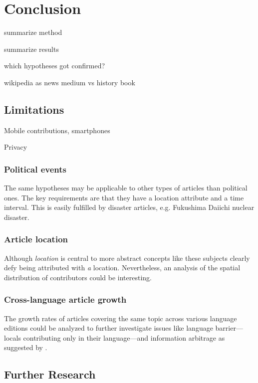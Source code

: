 \chapter{Conclusion}\label{ch:conclusion}

\begin{todos}
	\item summarize method
	\item summarize results
	\item which hypotheses got confirmed? 
    \item wikipedia as news medium vs history book
\end{todos}


\section{Limitations}

\begin{todos}
    \item Mobile contributions, smartphones
    \item Privacy
\end{todos}

\subsection{Political events}
The same hypotheses may be applicable to other types of articles than political ones.
The key requirements are that they have a location attribute and a time interval.
This is easily fulfilled by disaster articles, e.g. Fukushima Daiichi nuclear disaster.

\subsection{Article location}
Although \emph{location} is central to more abstract concepts like  these subjects clearly defy being attributed with \emph{a} location.
Nevertheless, an analysis of the spatial distribution of contributors could be interesting. 

\subsection{Cross-language article growth}
The growth rates of articles covering the same topic across various language editions could be analyzed to further investigate issues like language barrier---locals contributing only in their language---and information arbitrage as suggested by \textcite{adar2009information}.

\section{Further Research}
